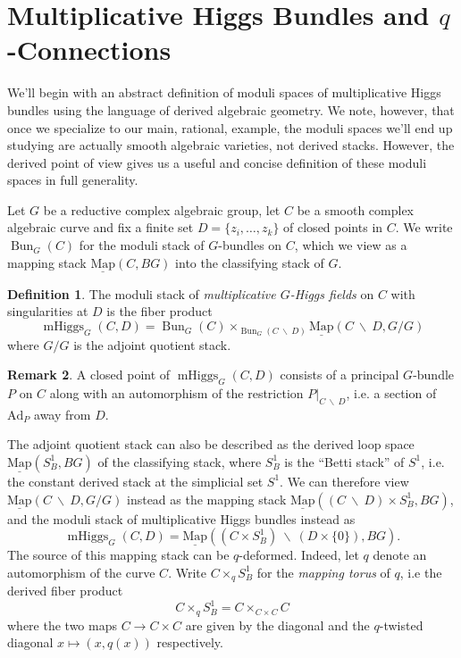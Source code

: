 \documentclass[11pt, oneside, reqno]{amsart}
\theoremstyle{definition} \newtheorem{definition}{Definition}[section]
\theoremstyle{definition} \newtheorem{remark}[definition]{Remark}
\theoremstyle{definition} \newtheorem{remarks}[definition]{Remarks}
\theoremstyle{definition} \newtheorem{question}[definition]{Question}
\theoremstyle{definition} \newtheorem*{note}{Note}
\theoremstyle{definition} \newtheorem{example}[definition]{Example}
\theoremstyle{definition} \newtheorem{examples}[definition]{Examples}
\newcommand{\mr}[1]{\mathrm{#1}}
\newcommand{\bs}{\ \backslash \ }
\newcommand{\ul}[1]{\underline{#1}}
\DeclareMathOperator{\bun}{Bun}
\DeclareMathOperator{\mhiggs}{mHiggs}
\newcommand{\map}{\ul{\mr{Map}}}
\newcommand{\Ad}{\mr{Ad}}
\begin{document}
\section{Multiplicative Higgs Bundles and $q$-Connections} \label{mhiggs_def_section}
We'll begin with an abstract definition of moduli spaces of multiplicative Higgs bundles using the language of derived algebraic geometry.  We note, however, that once we specialize to our main, rational, example, the moduli spaces we'll end up studying are actually smooth algebraic varieties, not derived stacks.  However, the derived point of view gives us a useful and concise definition of these moduli spaces in full generality.

Let $G$ be a reductive complex algebraic group, let $C$ be a smooth complex algebraic curve and fix a finite set $D = \{z_i, \ldots, z_k\}$ of closed points in $C$.  We write $\bun_G(C)$ for the moduli stack of $G$-bundles on $C$, which we view as a mapping stack $\map(C, BG)$ into the classifying stack of $G$.

\begin{definition}
The moduli stack of \emph{multiplicative $G$-Higgs fields} on $C$ with singularities at $D$ is the fiber product
\[\mhiggs_G(C,D) = \bun_G(C) \times_{\bun_G(C \! \bs \! D)} \map(C \! \bs \! D, G/G)\]
where $G/G$ is the adjoint quotient stack.
\end{definition}

\begin{remark}
A closed point of $\mhiggs_G(C,D)$ consists of a principal $G$-bundle $P$ on $C$ along with an automorphism of the restriction $P|_{C \! \bs \! D}$, i.e. a section of $\Ad_P$ away from $D$.
\end{remark}

The adjoint quotient stack can also be described as the derived loop space $\map(S^1_B, BG)$ of the classifying stack, where $S^1_B$ is the ``Betti stack'' of $S^1$, i.e. the constant derived stack at the simplicial set $S^1$.  We can therefore view $\map(C \! \bs \! D, G/G)$ instead as the mapping stack $\map((C \! \bs \! D) \times S^1_B, BG)$, and the moduli stack of multiplicative Higgs bundles instead as
\[\mhiggs_G(C,D) = \map((C \times S^1_B) \bs (D \times \{0\}), BG).\]  
The source of this mapping stack can be $q$-deformed.  Indeed, let $q$ denote an automorphism of the curve $C$.  Write $C \times_q S^1_B$ for the \emph{mapping torus} of $q$, i.e the derived fiber product
\[C \times_q S^1_B = C \times_{C \times C} C\]
where the two maps $C \to C \times C$ are given by the diagonal and the $q$-twisted diagonal $x \mapsto (x,q(x))$ respectively.
\end{document}
